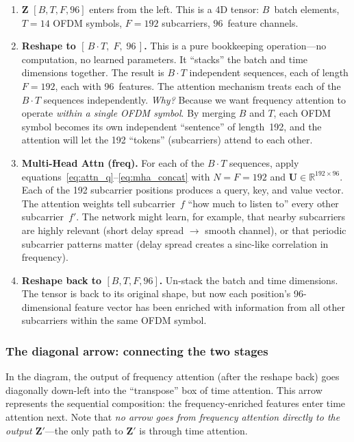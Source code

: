 \documentclass[11pt,a4paper]{article}
\begin{document}
	\begin{enumerate}[nosep]
		\item $\mathbf{Z}$ $[B, T, F, 96]$ enters from the left.  This is a 4D tensor: $B$~batch elements, $T\!=\!14$ OFDM symbols, $F\!=\!192$ subcarriers, $96$~feature channels.
		
		\item \textbf{Reshape to $[\,B \!\cdot\! T,\; F,\; 96\,]$.}  This is a pure bookkeeping operation---no computation, no learned parameters.  It ``stacks'' the batch and time dimensions together.  The result is $B \!\cdot\! T$ independent sequences, each of length $F\!=\!192$, each with 96~features.  The attention mechanism treats each of the $B \!\cdot\! T$ sequences independently.  \emph{Why?}  Because we want frequency attention to operate \emph{within a single OFDM symbol}.  By merging $B$ and $T$, each OFDM symbol becomes its own independent ``sentence'' of length~192, and the attention will let the 192 ``tokens'' (subcarriers) attend to each other.
		
		\item \textbf{Multi-Head Attn (freq).}  For each of the $B \!\cdot\! T$ sequences, apply equations~\eqref{eq:attn_q}--\eqref{eq:mha_concat} with $N\!=\!F\!=\!192$ and $\mathbf{U} \in \mathbb{R}^{192 \times 96}$.  Each of the 192 subcarrier positions produces a query, key, and value vector.  The attention weights tell subcarrier~$f$ ``how much to listen to'' every other subcarrier~$f'$.  The network might learn, for example, that nearby subcarriers are highly relevant (short delay spread $\to$ smooth channel), or that periodic subcarrier patterns matter (delay spread creates a sinc-like correlation in frequency).
		
		\item \textbf{Reshape back to $[B, T, F, 96]$.}  Un-stack the batch and time dimensions.  The tensor is back to its original shape, but now each position's 96-dimensional feature vector has been enriched with information from all other subcarriers within the same OFDM symbol.
	\end{enumerate}
	
	\subsubsection*{The diagonal arrow: connecting the two stages}
	
	In the diagram, the output of frequency attention (after the reshape back) goes diagonally down-left into the ``transpose'' box of time attention.  This arrow represents the sequential composition: the frequency-enriched features enter time attention next.  Note that \emph{no arrow goes from frequency attention directly to the output $\mathbf{Z}'$}---the only path to $\mathbf{Z}'$ is through time attention.
	
\end{document}
